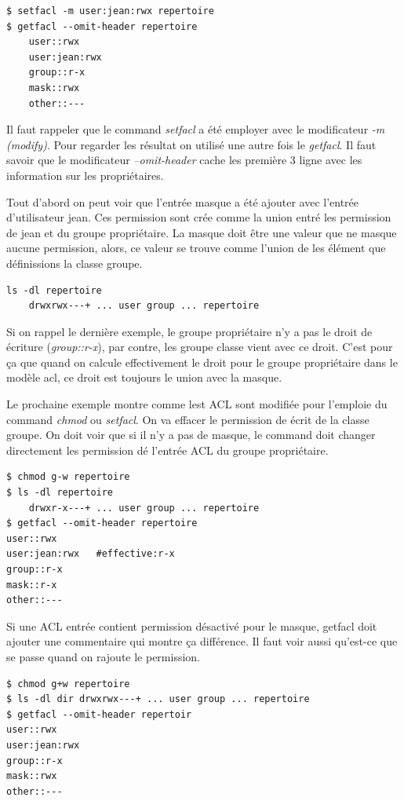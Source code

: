 \begin{verbatim}
$ setfacl -m user:jean:rwx repertoire
$ getfacl --omit-header repertoire 
	user::rwx 
	user:jean:rwx	
	group::r-x 
	mask::rwx 
	other::---
\end{verbatim}

Il faut rappeler que le command \emph{setfacl} a été employer avec le modificateur \emph{-m (modify)}. Pour regarder les résultat on utilisé une autre fois le \emph{getfacl}. Il faut savoir que le modificateur \emph{--omit-header} cache les première 3 ligne avec les information sur les propriétaires.  

Tout d'abord on peut voir que l'entrée masque a été ajouter avec l'entrée d'utilisateur jean. Ces permission sont crée comme la union entré les permission de jean et du groupe propriétaire. La masque doit être une valeur que ne masque aucune permission, alors, ce valeur se trouve comme l'union de les élément que définissions la classe groupe.  

\begin{verbatim}
ls -dl repertoire
	drwxrwx---+ ... user group ... repertoire
\end{verbatim}

Si on rappel le dernière exemple, le groupe propriétaire n'y a pas le droit de écriture (\emph{group::r-x}), par contre, les groupe classe vient avec ce droit. C'est pour ça que quand on calcule effectivement le droit pour le groupe propriétaire dans le modèle acl, ce droit est toujours le union avec la masque.

Le prochaine exemple montre comme lest ACL sont modifiée pour l'emploie du command \emph{chmod} ou \emph{setfacl}. On va effacer le permission de écrit de la classe groupe. On doit voir que si il n'y a pas de masque, le command doit changer directement les permission dé l'entrée ACL du groupe propriétaire. 


\begin{verbatim}
$ chmod g-w repertoire 
$ ls -dl repertoire 
	drwxr-x---+ ... user group ... repertoire 
$ getfacl --omit-header repertoire 
user::rwx 
user:jean:rwx 	#effective:r-x
group::r-x 	
mask::r-x 
other::---

\end{verbatim}

Si une ACL entrée contient permission désactivé pour le masque, getfacl doit ajouter une commentaire qui montre ça différence. Il faut voir aussi qu'est-ce que se passe quand on rajoute le permission. 

\begin{verbatim}
$ chmod g+w repertoire 
$ ls -dl dir drwxrwx---+ ... user group ... repertoire 
$ getfacl --omit-header repertoir 
user::rwx 
user:jean:rwx 
group::r-x
mask::rwx
other::---
\end{verbatim}


